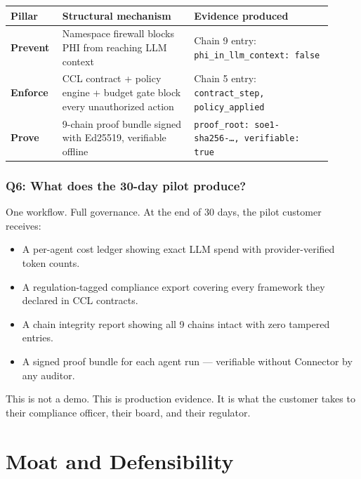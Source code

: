 \documentclass[11pt,a4paper]{article}
\begin{document}
\begin{center}
\begin{tabular}{@{}p{0.13\linewidth}p{0.38\linewidth}p{0.40\linewidth}@{}}
\toprule
\textbf{Pillar} & \textbf{Structural mechanism} & \textbf{Evidence produced} \\
\midrule
\textbf{Prevent} & Namespace firewall blocks PHI from reaching LLM context &
  Chain 9 entry: \texttt{phi\_in\_llm\_context: false} \\
\textbf{Enforce} & CCL contract + policy engine + budget gate block every unauthorized action &
  Chain 5 entry: \texttt{contract\_step, policy\_applied} \\
\textbf{Prove} & 9-chain proof bundle signed with Ed25519, verifiable offline &
  \texttt{proof\_root: soe1-sha256-\ldots, verifiable: true} \\
\bottomrule
\end{tabular}
\end{center}

\subsubsection*{Q6: What does the 30-day pilot produce?}

One workflow. Full governance. At the end of 30 days, the pilot customer receives:

\begin{itemize}
  \item A per-agent cost ledger showing exact LLM spend with provider-verified token counts.
  \item A regulation-tagged compliance export covering every framework they declared in CCL contracts.
  \item A chain integrity report showing all 9 chains intact with zero tampered entries.
  \item A signed proof bundle for each agent run — verifiable without Connector by any auditor.
\end{itemize}

This is not a demo. This is production evidence. It is what the customer takes to their compliance
officer, their board, and their regulator.

\clearpage

\section{Moat and Defensibility}
\label{sec:moat}
\end{document}
